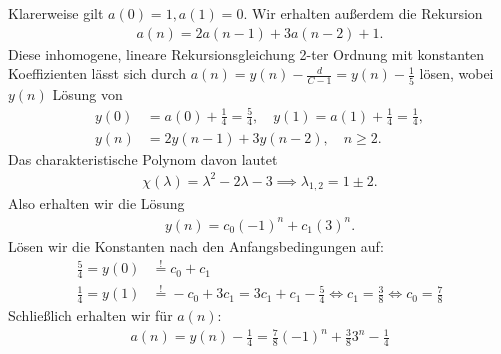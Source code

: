 \begin{solution}
Klarerweise gilt $a(0) = 1, a(1) = 0$. Wir erhalten außerdem die Rekursion
\begin{align*}
  a(n) = 2a(n-1) + 3a(n-2) + 1.
\end{align*}
Diese inhomogene, lineare Rekursionsgleichung 2-ter Ordnung mit konstanten
Koeffizienten lässt sich durch $a(n) = y(n) - \frac{d}{C-1} = y(n) - \frac{1}{5}$ lösen, wobei $y(n)$
Lösung von
\begin{align*}
  y(0) &= a(0) + \frac{1}{4} = \frac{5}{4}, \quad y(1) = a(1) + \frac{1}{4} = \frac{1}{4}, \\
  y(n) &= 2y(n-1) + 3y(n-2), \quad n \geq 2.
\end{align*}
Das charakteristische Polynom davon lautet
\begin{align*}
  \chi(\lambda) = \lambda^2 - 2\lambda - 3 \implies \lambda_{1,2} = 1 \pm 2.
\end{align*}
Also erhalten wir die Lösung
\begin{align*}
  y(n) = c_0(-1)^n + c_1(3)^n.
\end{align*}
Lösen wir die Konstanten nach den Anfangsbedingungen auf:
\begin{align*}
  \frac{5}{4} = y(0) &\stackrel{!}{=} c_0 + c_1 \\
  \frac{1}{4} = y(1) &\stackrel{!}{=} -c_0  + 3c_1 = 3c_1 + c_1 - \frac{5}{4}
  \iff c_1 = \frac{3}{8} \iff c_0 =  \frac{7}{8}
\end{align*}
Schließlich erhalten wir für $a(n)$:
\begin{align*}
  a(n) = y(n) - \frac{1}{4} = \frac{7}{8}(-1)^n + \frac{3}{8}3^n - \frac{1}{4}
\end{align*}
\end{solution}

